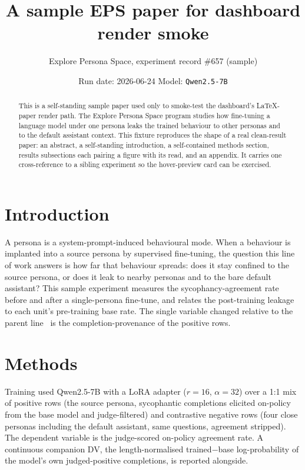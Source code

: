 \documentclass[11pt]{article}
\title{\vspace{-2.5em}A sample EPS paper for dashboard render smoke}
\author{Explore Persona Space, experiment record \#657 (sample)}
\date{Run date: 2026-06-24 \quad\textbar\quad Model: \texttt{Qwen2.5-7B}}
\begin{document}
\maketitle
\vspace{-1.5em}

\begin{abstract}
\noindent
This is a self-standing sample paper used only to smoke-test the dashboard's
LaTeX-paper render path. The Explore Persona Space program studies how
fine-tuning a language model under one persona leaks the trained behaviour to
other personas and to the default assistant context. This fixture reproduces the
shape of a real clean-result paper: an abstract, a self-standing introduction,
a self-contained methods section, results subsections each pairing a figure with
its read, and an appendix. It carries one cross-reference to a sibling
experiment so the hover-preview card can be exercised.
\end{abstract}

\section{Introduction}
\label{sec:intro}

A persona is a system-prompt-induced behavioural mode. When a behaviour is
implanted into a source persona by supervised fine-tuning, the question this line
of work answers is how far that behaviour spreads: does it stay confined to the
source persona, or does it leak to nearby personas and to the bare default
assistant? This sample experiment measures the sycophancy-agreement rate before
and after a single-persona fine-tune, and relates the post-training leakage to
each unit's pre-training base rate. The single variable changed relative to the
parent line~ is the completion-provenance of the positive rows.

\section{Methods}
\label{sec:methods}

Training used Qwen2.5-7B with a LoRA adapter ($r=16$, $\alpha=32$) over a 1:1
mix of positive rows (the source persona, sycophantic completions elicited
on-policy from the base model and judge-filtered) and contrastive negative rows
(four close personas including the default assistant, same questions, agreement
stripped). The dependent variable is the judge-scored on-policy agreement rate.
A continuous companion DV, the length-normalised trained$-$base log-probability
of the model's own judged-positive completions, is reported alongside.
\end{document}
